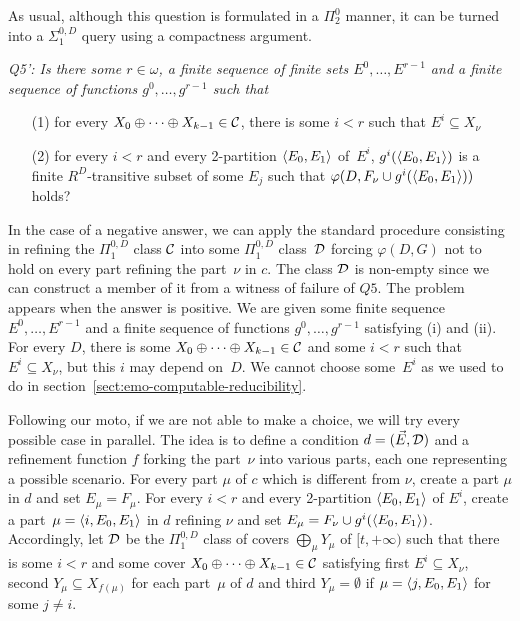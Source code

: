 As usual, although this question is formulated in a $\Pi^0_2$ manner, it can be turned into a $\Sigma^{0,D}_1$ query 
using a compactness argument.

\smallskip
{\itshape
Q5': Is there some $r \in \omega$, a finite sequence of finite sets $E^0, \dots, E^{r-1}$ 
and a finite sequence of functions $g^0, \dots, g^{r-1}$ such that
\begin{itemize}
	\item[(1)] for every $X_0 \oplus \dots \oplus X_{k-1} \in \mathcal{C}$, there is some $i < r$ such that $E^i \subseteq X_\nu$
	\item[(2)] for every $i < r$ and every 2-partition $\left\langle E_0, E_1 \right\rangle$ of~$E^i$,
	$g^i(\left\langle E_0, E_1 \right\rangle)$ is a finite $R^D$-transitive subset of some $E_j$ such that $\varphi(D, F_\nu \cup g^i(\left\langle E_0, E_1 \right\rangle))$ holds?
\end{itemize}
}
\smallskip

In the case of a negative answer, we can apply the standard procedure consisting in refining the $\Pi^{0,D}_1$ class $\mathcal{C}$
into some $\Pi^{0,D}_1$ class~$\mathcal{D}$ forcing $\varphi(D, G)$ not to hold on every part refining the part~$\nu$ in $c$.
The class $\mathcal{D}$ is non-empty since we can construct a member of it from a witness of failure of $Q5$.
The problem appears when the answer is positive. We are given some finite sequence $E^0, \dots, E^{r-1}$ 
and a finite sequence of functions $g^0, \dots, g^{r-1}$ satisfying (i) and (ii).
For every $D$, there is some $X_0 \oplus \dots \oplus X_{k-1} \in \mathcal{C}$ and some $i < r$
such that $E^i \subseteq X_\nu$, but this $i$ may depend on~$D$. We cannot choose some~$E^i$
as we used to do in section~\ref{sect:emo-computable-reducibility}.

Following our moto, if we are not able to make a choice, we will try every possible case in parallel.
The idea is to define a condition $d = (\vec{E}, \mathcal{D})$ and a refinement function $f$ forking the part~$\nu$ into various parts, each one representing a possible scenario. For every part $\mu$ of $c$ which is different from $\nu$, 
create a part $\mu$ in $d$ and set $E_\mu = F_\mu$. For every $i < r$ and every 2-partition $\left\langle E_0, E_1 \right\rangle$ of $E^i$,
create a part~$\mu = \left\langle i, E_0, E_1 \right\rangle$ in $d$ refining $\nu$ and set $E_\mu = F_\nu \cup g^i(\left\langle E_0, E_1 \right\rangle)$.
Accordingly, let $\mathcal{D}$ be the $\Pi^{0,D}_1$ class of covers $\bigoplus_\mu Y_\mu$ of $[t, +\infty)$
such that there is some $i < r$ and some cover $X_0 \oplus \dots \oplus X_{k-1} \in \mathcal{C}$ satisfying first
$E^i \subseteq X_\nu$, second $Y_\mu \subseteq X_{f(\mu)}$ for each part~$\mu$ of $d$
and third $Y_\mu = \emptyset$ if $\mu = \left\langle j, E_0, E_1 \right\rangle$ for some $j \neq i$.

